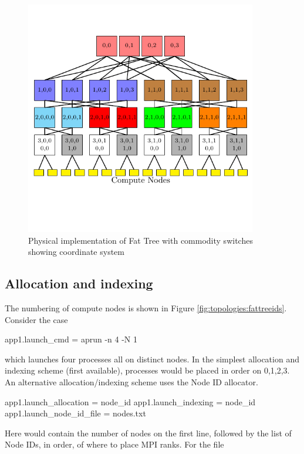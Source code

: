 \begin{figure}[h!]
\centering
\includegraphics[width=0.9\textwidth]{figures/tikz/fattree/fattree_coords.pdf}
\caption{Physical implementation of Fat Tree with commodity switches showing coordinate system}
\label{fig:topologies:fattreecoords}
\end{figure}

\subsection{Allocation and indexing}
The numbering of compute nodes is shown in Figure \ref{fig:topologies:fattreeids}.
Consider the case

\begin{ViFile}
app1.launch_cmd = aprun -n 4 -N 1
\end{ViFile}
which launches four processes all on distinct nodes.
In the simplest allocation and indexing scheme (first available),
processes would be placed in order on 0,1,2,3.
An alternative allocation/indexing scheme uses the Node ID allocator.

\begin{ViFile}
app1.launch_allocation = node_id
app1.launch_indexing = node_id
app1.launch_node_id_file = nodes.txt
\end{ViFile}
Here  would contain the number of nodes on the first line, followed by the list of Node IDs, in order, of where to place MPI ranks.
For the file

